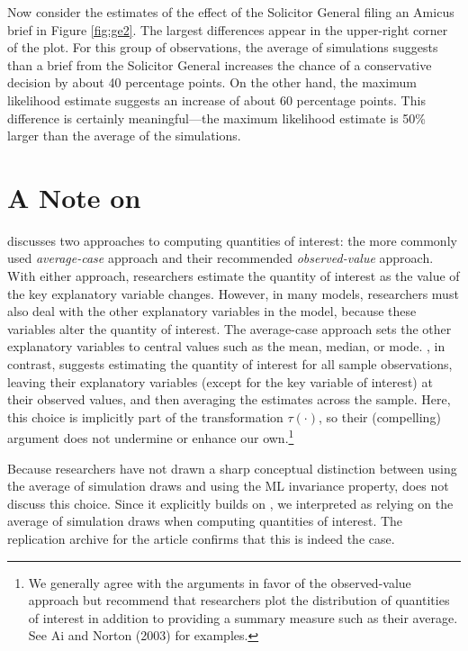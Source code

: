 \documentclass[11pt]{article}
\begin{document}
Now consider the estimates of the effect of the Solicitor General filing an Amicus brief in Figure \ref{fig:ge2}.
The largest differences appear in the upper-right corner of the plot.
For this group of observations, the average of simulations suggests than a brief from the Solicitor General increases the chance of a conservative decision by about 40 percentage points.
On the other hand, the maximum likelihood estimate suggests an increase of about 60 percentage points.
This difference is certainly meaningful---the maximum likelihood estimate is 50\% larger than the average of the simulations.

\section*{A Note on \cite{HanmerKalkan2013}}

\cite{HanmerKalkan2013} discusses two approaches to computing quantities of interest: the more commonly used {\it average-case} approach and their recommended {\it observed-value} approach.
With either approach, researchers estimate the quantity of interest as the value of the key explanatory variable changes.
However, in many models, researchers must also deal with the other explanatory variables in the model, because these variables alter the quantity of interest.
The average-case approach sets the other explanatory variables to central values such as the mean, median, or mode.
\cite{HanmerKalkan2013}, in contrast, suggests estimating the quantity of interest for all sample observations, leaving their explanatory variables (except for the key variable of interest) at their observed values, and then averaging the estimates across the sample.
Here, this choice is implicitly part of the transformation $\tau(\cdot)$, so their (compelling) argument does not undermine or enhance our own.\footnote{We generally agree with the arguments in favor of the observed-value approach but recommend that researchers plot the distribution of quantities of interest in addition to providing a summary measure such as their average.
See Ai and Norton (2003) for examples.}

Because researchers have not drawn a sharp conceptual distinction between using the average of simulation draws and using the ML invariance property, \cite{HanmerKalkan2013} does not discuss this choice.
Since it explicitly builds on \cite{KingTomzWittenberg2000}, we interpreted \cite{HanmerKalkan2013} as relying on the average of simulation draws when computing quantities of interest.
The replication archive for the article confirms that this is indeed the case.
\end{document}
